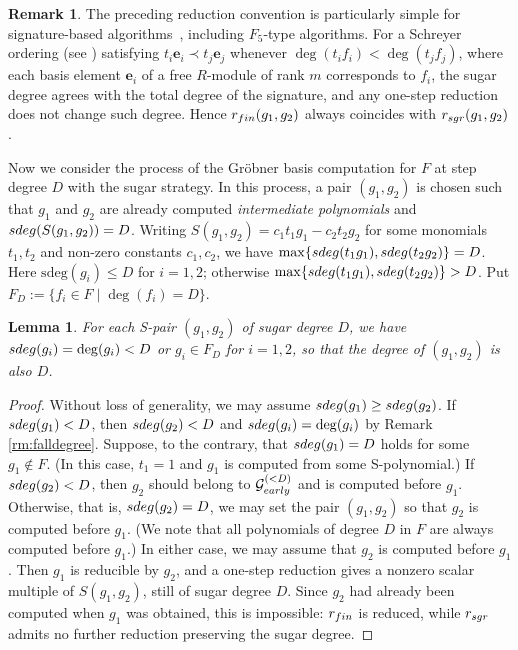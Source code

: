 \documentclass{article}
\newtheorem{lemma}[theorem]{Lemma}
\theoremstyle{definition}
\newtheorem{remark}[theorem]{Remark}
\theoremstyle{plain}
\theoremstyle{plain}
\theoremstyle{plain}
\theoremstyle{plain}
\numberwithin{equation}{subsection}
\begin{document}
\begin{remark}
The preceding reduction convention is particularly simple for signature-based algorithms~\cite{EF}, including $F_5$-type algorithms.
For a Schreyer ordering (see \cite[p.\ 161]{Singular}) satisfying $t_i\bm e_i\prec t_j\bm e_j$ whenever $\deg(t_if_i)<\deg(t_jf_j)$, where each basis element $\bm{e}_i$ of a free $R$-module of rank $m$ corresponds to $f_i$, the sugar degree agrees with the total degree of the signature, and any one-step reduction does not change such degree. 
Hence $r_{\rm fin}(g_1,g_2)$ always coincides with $r_{\rm sgr}(g_1,g_2)$.
\end{remark}

Now we consider the process of the Gr\"obner basis computation for $F$ at step degree $D$ with the sugar strategy.
In this process, a pair $(g_1,g_2)$ is chosen such that $g_1$ and $g_2$ are already computed {\em intermediate polynomials} and ${\rm sdeg}(S(g_1,g_2))=D$.  
Writing $S(g_1,g_2)=c_1t_1g_1-c_2t_2g_2$ for some monomials $t_1,t_2$ and non-zero constants $c_1,c_2$, we have $\max\{{\rm sdeg}(t_1g_1),{\rm sdeg}(t_2g_2)\}=D$.
Here $\mathrm{sdeg}(g_i) \leq D$ for $i=1,2$; otherwise $\max\{{\rm sdeg}(t_1g_1),{\rm sdeg}(t_2g_2)\}>D$.
Put $F_D:=\{f_i\in F\mid \deg(f_i)=D\}$.

\begin{lemma}\label{lm:sdeg_of_Spair}
For each S-pair $(g_1,g_2)$ of sugar degree $D$, we have ${\rm sdeg}(g_i)=\deg(g_i)<D$ or $g_i\in F_D$ for $i=1,2$, so that the degree of $(g_1,g_2)$ is also $D$.
\end{lemma}

\begin{proof}
Without loss of generality, we may assume ${\rm sdeg}(g_1)\geq {\rm sdeg}(g_2)$. 
If ${\rm sdeg}(g_1)<D$, then ${\rm sdeg}(g_2)<D$ and ${\rm sdeg}(g_i)=\deg(g_i)$ by Remark \ref{rm:falldegree}.
Suppose, to the contrary, that ${\rm sdeg}(g_1)=D$ holds for some $g_1\not\in F$.
(In this case, $t_1=1$ and $g_1$ is computed from some S-polynomial.) 
If ${\rm sdeg}(g_2)<D$, then $g_2$ should belong to $\mathcal{G}_{\rm early}^{(<D)}$ and is computed before $g_1$.
Otherwise, that is, ${\rm sdeg}(g_2)=D$, we may set the pair $(g_1,g_2)$ so that $g_2$ is computed before $g_1$.
(We note that all polynomials of degree $D$ in $F$ are always computed before $g_1$.) 
In either case, we may assume that $g_2$ is computed before $g_1$. 
Then $g_1$ is reducible by $g_2$, and a one-step reduction gives a nonzero scalar multiple of $S(g_1,g_2)$, still of sugar degree $D$.
Since $g_2$ had already been computed when $g_1$ was obtained, this is impossible: $r_{\rm fin}$ is reduced, while $r_{\rm sgr}$ admits no further reduction preserving the sugar degree.
\end{proof}
\end{document}
